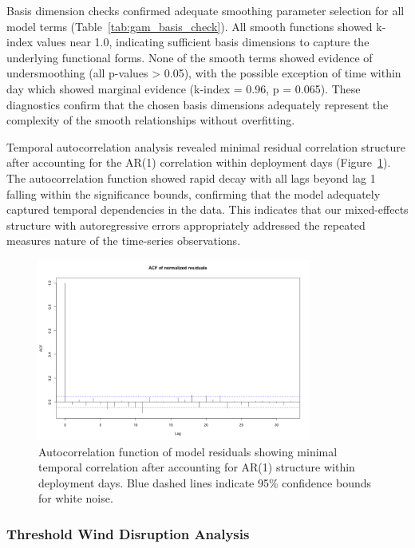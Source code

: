 Basis dimension checks confirmed adequate smoothing parameter selection for all model terms (Table~\ref{tab:gam_basis_check}). All smooth functions showed k-index values near 1.0, indicating sufficient basis dimensions to capture the underlying functional forms. None of the smooth terms showed evidence of undersmoothing (all p-values > 0.05), with the possible exception of time within day which showed marginal evidence (k-index = 0.96, p = 0.065). These diagnostics confirm that the chosen basis dimensions adequately represent the complexity of the smooth relationships without overfitting.



Temporal autocorrelation analysis revealed minimal residual correlation structure after accounting for the AR(1) correlation within deployment days (Figure~\ref{fig:acf_diagnostics}). The autocorrelation function showed rapid decay with all lags beyond lag 1 falling within the significance bounds, confirming that the model adequately captured temporal dependencies in the data. This indicates that our mixed-effects structure with autoregressive errors appropriately addressed the repeated measures nature of the time-series observations.

\begin{figure}[htbp]
    \centering
    \includegraphics[width=0.8\textwidth]{supplemental/results/30_min/figures/diag_acf.png}
    \caption[Autocorrelation function (M50)]{Autocorrelation function of model residuals showing minimal temporal correlation after accounting for AR(1) structure within deployment days. Blue dashed lines indicate 95\% confidence bounds for white noise.}
    \label{fig:acf_diagnostics}
\end{figure} 

\subsubsection{Threshold Wind Disruption Analysis}


